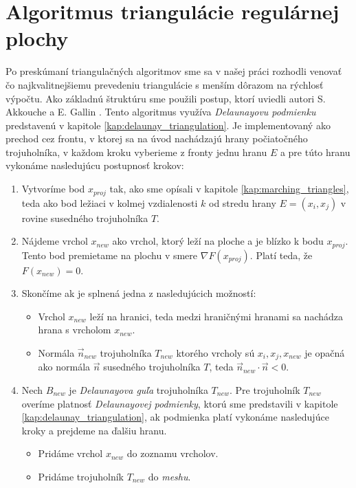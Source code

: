 \chapter{Algoritmus triangulácie regulárnej plochy}
\label{kap:algoritmus}
Po preskúmaní triangulačných algoritmov sme sa v našej práci rozhodli venovať čo najkvalitnejšiemu
prevedeniu triangulácie s menším dôrazom na rýchlosť výpočtu. Ako základnú štruktúru sme použili 
postup, ktorí uviedli autori S. Akkouche a E. Gallin \cite{hilton1996marching}. Tento algoritmus využíva 
\textit{Delaunayovu podmienku} predstavenú v kapitole \ref{kap:delaunay_triangulation}.
Je implementovaný ako prechod cez frontu, v ktorej sa na úvod nachádzajú
hrany počiatočného trojuholníka, v každom kroku vyberieme z fronty jednu hranu $E$ a pre túto
hranu vykonáme nasledujúcu postupnosť krokov:
\begin{enumerate}
    \item{Vytvoríme bod $x_{proj}$ tak, ako sme opísali v kapitole \ref{kap:marching_triangles}, teda 
    ako bod ležiaci v kolmej vzdialenosti $k$ od stredu hrany $E = (x_i, x_j)$ 
    v rovine susedného trojuholníka $T$.}
    \item{Nájdeme vrchol $x_{new}$ ako vrchol, ktorý leží na ploche a je blízko k bodu 
    $x_{proj}$. Tento bod premietame na plochu v smere $\nabla F(x_{proj})$.
    Platí teda, že $F(x_{new}) = 0$.}
    \item{Skončíme ak je splnená jedna z nasledujúcich možností:
    \begin{itemize}
        \item{Vrchol $x_{new}$ leží na hranici, teda medzi hraničnými 
        hranami sa nachádza hrana s vrcholom $x_{new}$.}
        \item{Normála $\vec{n}_{new}$ trojuholníka $T_{new}$ ktorého vrcholy sú $x_i, 
        x_j, x_{new}$ je opačná ako
        normála $\vec{n}$ susedného trojuholníka $T$, teda 
        $\vec{n}_{new} \cdot \vec{n} < 0$.}
    \end{itemize}
    }
    \item{Nech $B_{new}$ je \textit{Delaunayova guľa} trojuholníka $T_{new}$.
        Pre trojuholník $T_{new}$ overíme platnosť \textit{Delaunayovej podmienky}, 
    ktorú sme predstavili v kapitole \ref{kap:delaunay_triangulation}, ak podmienka platí
    vykonáme nasledujúce kroky a prejdeme na ďalšiu hranu.
    \begin{itemize}
        \item{Pridáme vrchol $x_{new}$ do zoznamu vrcholov.}
        \item{Pridáme trojuholník $T_{new}$ do \textit{meshu}.}

\end{itemize}}
\end{enumerate}

